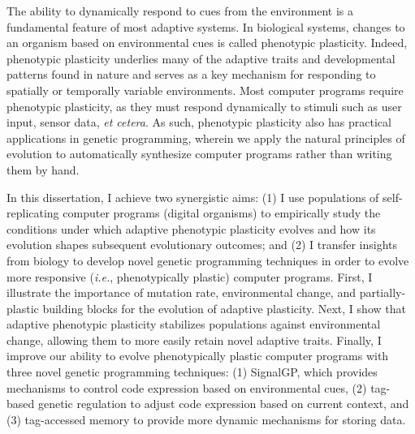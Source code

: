 
The ability to dynamically respond to cues from the environment is a fundamental feature of most adaptive systems.
In biological systems, changes to an organism based on environmental cues is called phenotypic plasticity.
Indeed, phenotypic plasticity underlies many of the adaptive traits and developmental patterns found in nature and serves as a key mechanism for responding to spatially or temporally variable environments.
Most computer programs require phenotypic plasticity, as they must respond dynamically to stimuli such as user input, sensor data, \textit{et cetera}. 
As such, phenotypic plasticity also has practical applications in genetic programming, wherein we apply the natural principles of evolution to automatically synthesize computer programs rather than writing them by hand.

In this dissertation, I achieve two synergistic aims: (1) I use populations of self-replicating computer programs (digital organisms) to empirically study the conditions under which adaptive phenotypic plasticity evolves and how its evolution shapes subsequent evolutionary outcomes; and (2) I transfer insights from biology to develop novel genetic programming techniques in order to evolve more responsive (\textit{i.e.}, phenotypically plastic) computer programs. 
First, I illustrate the importance of mutation rate, environmental change, and partially-plastic building blocks for the evolution of adaptive plasticity. 
Next, I show that adaptive phenotypic plasticity stabilizes populations against environmental change, allowing them to more easily retain novel adaptive traits. 
Finally, I improve our ability to evolve phenotypically plastic computer programs with three novel genetic programming techniques: 
(1) SignalGP, which provides mechanisms to control code expression based on environmental cues, (2) tag-based genetic regulation to adjust code expression based on current context, and (3) tag-accessed memory to provide more dynamic mechanisms for storing data.



